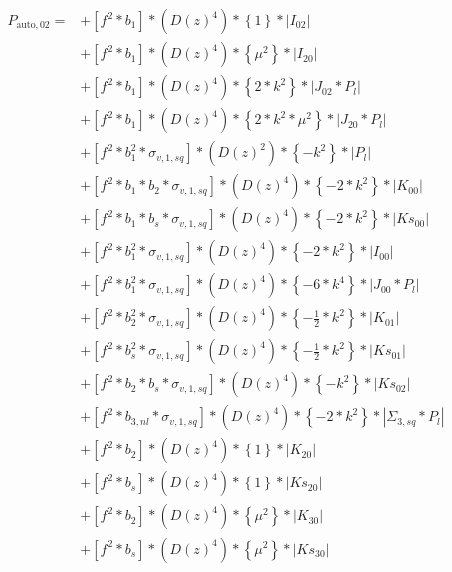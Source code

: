 \documentclass{article}
\begin{document}
\begin{equation}
\begin{aligned}  
P_{\mathrm{auto},02}=
&+\left[f^{2}*b_{1}\right]*\left(D(z)^{4}\right)*\left\{1\right\}*\left|I_{02}\right| \\
&+\left[f^{2}*b_{1}\right]*\left(D(z)^{4}\right)*\left\{\mu^{2}\right\}*\left|I_{20}\right| \\
&+\left[f^{2}*b_{1}\right]*\left(D(z)^{4}\right)*\left\{2*k^{2}\right\}*\left|J_{02}*P_l\right| \\
&+\left[f^{2}*b_{1}\right]*\left(D(z)^{4}\right)*\left\{2*k^{2}*\mu^{2}\right\}*\left|J_{20}*P_l\right| \\
&+\left[f^{2}*b_{1}^{2}*\sigma_{v,1,sq}\right]*\left(D(z)^{2}\right)*\left\{-k^{2}\right\}*\left|P_l\right| \\
&+\left[f^{2}*b_{1}*b_{2}*\sigma_{v,1,sq}\right]*\left(D(z)^{4}\right)*\left\{-2*k^{2}\right\}*\left|K_{00}\right| \\
&+\left[f^{2}*b_{1}*b_{s}*\sigma_{v,1,sq}\right]*\left(D(z)^{4}\right)*\left\{-2*k^{2}\right\}*\left|Ks_{00}\right| \\
&+\left[f^{2}*b_{1}^{2}*\sigma_{v,1,sq}\right]*\left(D(z)^{4}\right)*\left\{-2*k^{2}\right\}*\left|I_{00}\right| \\
&+\left[f^{2}*b_{1}^{2}*\sigma_{v,1,sq}\right]*\left(D(z)^{4}\right)*\left\{-6*k^{4}\right\}*\left|J_{00}*P_l\right| \\
&+\left[f^{2}*b_{2}^{2}*\sigma_{v,1,sq}\right]*\left(D(z)^{4}\right)*\left\{-\frac{1}{2}*k^{2}\right\}*\left|K_{01}\right| \\
&+\left[f^{2}*b_{s}^{2}*\sigma_{v,1,sq}\right]*\left(D(z)^{4}\right)*\left\{-\frac{1}{2}*k^{2}\right\}*\left|Ks_{01}\right| \\
&+\left[f^{2}*b_{2}*b_{s}*\sigma_{v,1,sq}\right]*\left(D(z)^{4}\right)*\left\{-k^{2}\right\}*\left|Ks_{02}\right| \\
&+\left[f^{2}*b_{3,nl}*\sigma_{v,1,sq}\right]*\left(D(z)^{4}\right)*\left\{-2*k^{2}\right\}*\left|\Sigma_{3,sq}*P_l\right| \\
&+\left[f^{2}*b_{2}\right]*\left(D(z)^{4}\right)*\left\{1\right\}*\left|K_{20}\right| \\
&+\left[f^{2}*b_{s}\right]*\left(D(z)^{4}\right)*\left\{1\right\}*\left|Ks_{20}\right| \\
&+\left[f^{2}*b_{2}\right]*\left(D(z)^{4}\right)*\left\{\mu^{2}\right\}*\left|K_{30}\right| \\
&+\left[f^{2}*b_{s}\right]*\left(D(z)^{4}\right)*\left\{\mu^{2}\right\}*\left|Ks_{30}\right| \\
\end{aligned}
\end{equation}
\end{document}
